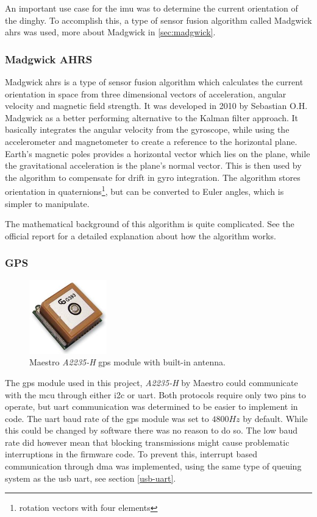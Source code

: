 An important use case for the \gls{imu} was to determine the current orientation of the dinghy. To accomplish this, a type of sensor fusion algorithm called Madgwick \gls{ahrs} was used, more about Madgwick in \autoref{sec:madgwick}.

\subsubsection{Madgwick AHRS}
\label{sec:madgwick}
Madgwick \gls{ahrs} is a type of sensor fusion algorithm which calculates the current orientation in space from three dimensional vectors of acceleration, angular velocity and magnetic field strength. It was developed in 2010 by Sebastian O.H. Madgwick as a better performing alternative to the Kalman filter approach\cite{madgwick}. It basically integrates the angular velocity from the gyroscope, while using the accelerometer and magnetometer to create a reference to the horizontal plane. Earth’s magnetic poles provides a horizontal vector which lies on the plane, while the gravitational acceleration is the plane’s normal vector. This is then used by the algorithm to compensate for drift in gyro integration. The algorithm stores orientation in quaternions\footnote{rotation vectors with four elements}, but can be converted to Euler angles, which is simpler to manipulate.

The mathematical background of this algorithm is quite complicated. See the official report\cite{madgwick-report} for a detailed explanation about how the algorithm works.

\subsubsection{GPS}
\begin{figure}[H]
\centering
\includegraphics[width=0.3\textwidth]{Figures/A2235-H.jpg}
\caption{Maestro \emph{A2235-H} \gls{gps} module with built-in antenna.}
\label{gps-figure}
\end{figure}
The \gls{gps} module used in this project, \emph{A2235-H} by Maestro \cite{gps} could communicate with the \gls{mcu} through either \gls{i2c} or \gls{uart}. Both protocols require only two pins to operate, but \gls{uart} communication was determined to be easier to implement in code. The \gls{uart} baud rate of the \gls{gps} module was set to $4800Hz$ by default. While this could be changed by software there was no reason to do so. The low baud rate did however mean that blocking transmissions might cause problematic interruptions in the firmware code. To prevent this, interrupt based communication through \gls{dma} was implemented, using the same type of queuing system as the \gls{usb} \gls{uart}, see section \ref{usb-uart}.

